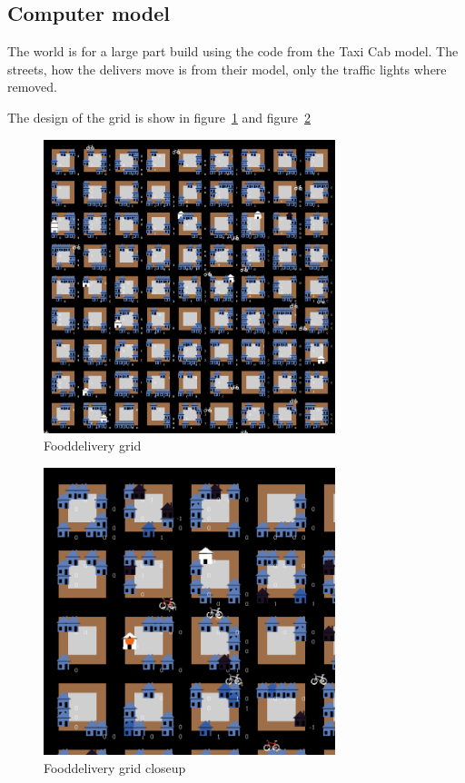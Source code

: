 \subsection{Computer model}\label{subsec:computer-model}
The world is for a large part build using the code from the Taxi Cab model.
The streets, how the delivers move is from their model, only the traffic lights where removed.

The design of the grid is show in figure~\ref{fig:grid} and figure~\ref{fig:grid closeup}
\begin{figure}
    \centering
    \includegraphics[width=8.5cm]{sections/pics/grid}
    \caption{Fooddelivery grid}
    \label{fig:grid}
\end{figure}
\begin{figure}
    \centering
    \includegraphics[width=8.5cm]{sections/pics/grid_closeup}
    \caption{Fooddelivery grid closeup}
    \label{fig:grid closeup}
\end{figure}
